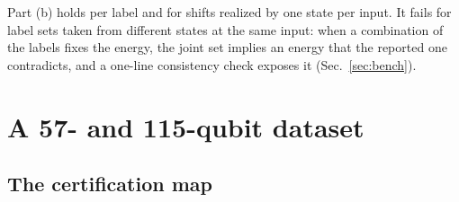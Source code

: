 \documentclass[aps,prx,twocolumn,10pt,superscriptaddress,nofootinbib,longbibliography,floatfix]{revtex4-2}
\theoremstyle{remark}
\begin{document}
Part (b) holds per label and for shifts realized by one state per input. It fails for label sets taken from
different states at the same input: when a combination of the labels fixes the energy, the joint set implies an
energy that the reported one contradicts, and a one-line consistency check exposes it (Sec.~\ref{sec:bench}).

\section{A 57- and 115-qubit dataset}
\label{sec:dataset}

\subsection{The certification map}
\label{sec:map}
\end{document}
